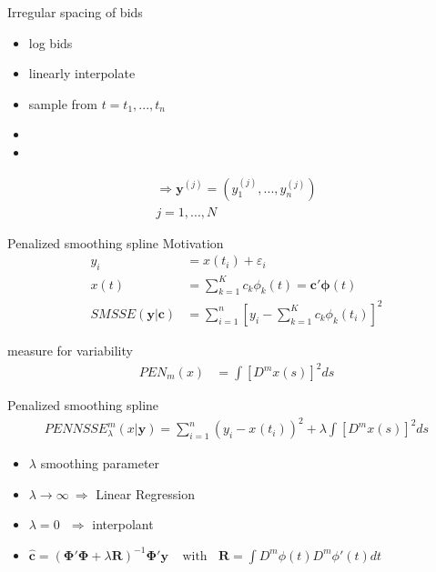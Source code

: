 \documentclass[hyperref={pdfpagelabels=false}]{beamer}
\begin{document}
\begin{frame}{Irregular spacing of bids}
\begin{minipage}[c]{0.5\textwidth}
    \begin{itemize}
    \item log bids
    \item linearly interpolate
    \item sample from $t=t_1,...,t_n$
    \item[] 
    \item[] 
    \end{itemize}
    \begin{align*}
    \Rightarrow \mathbf{y}^{(j)}=(y_1^{(j)},...,y_n^{(j)}) \\ j=1,...,N
    \end{align*}
    \end{minipage} 
    \end{frame}
    
    \begin{frame}{Penalized smoothing spline}
    Motivation 
    \begin{align*} 
    y_i&=x(t_i)+\varepsilon_i \\ x(t)&=\sum_{k=1}^Kc_k\phi_k(t)=\mathbf{c'}\boldsymbol\phi(t) \\ 
    SMSSE(\mathbf{y}|\mathbf{c})&=\sum_{i=1}^n[y_i-\sum_{k=1}^Kc_k\phi_k(t_i)]^2
    \end{align*}
    
    measure for variability
    \begin{align*}
    PEN_m(x)&=\int[D^mx(s)]^2ds
    \end{align*}
    \end{frame} %
    
    
    \begin{frame}{Penalized smoothing spline} %
    \begin{align*}
    PENNSSE^{m}_{\lambda}(x|\mathbf{y})=\sum_{i=1}^n (y_i^{}-x^{}(t_i))^2+\lambda \int[D^mx(s)]^2ds
    \end{align*}
    \begin{itemize}
    \item[] $\lambda$ smoothing parameter
    \item[] $\lambda \rightarrow \infty \ \Rightarrow $ Linear Regression
    \item[] $\lambda = 0 \ \ \  \Rightarrow$ interpolant 
    \end{itemize}
    \begin{itemize}
    \item[] $\hat{\mathbf{c}}=(\boldsymbol\Phi'\boldsymbol\Phi+\lambda\mathbf{R})^{-1}\boldsymbol\Phi' \mathbf{y}\ \ \ \ \ \text{with} \ \  \ \ \mathbf{R}=\int D^m \phi(t) D^m \phi '(t)dt$
    \end{itemize}
    \end{frame}
\end{document}
